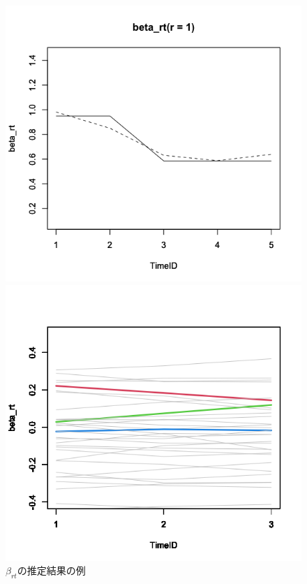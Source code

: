\documentclass[dvipdfmx, twocolumn, a4paper]{hcresume}
\begin{document}
\begin{figure}[t]
  \begin{minipage}[b]{4cm}
    \includegraphics[keepaspectratio, scale=0.22]{img/beta_rt_param.png}
  \end{minipage}
  \begin{minipage}[b]{4cm}
    \includegraphics[keepaspectratio, scale=0.22]{img/beta_rt_data.png}
  \end{minipage}
  \caption{$\beta_{rt}$の推定結果の例}
  \label{beta_rt_data}
  \vspace*{0.5cm}
\end{figure}
\end{document}
